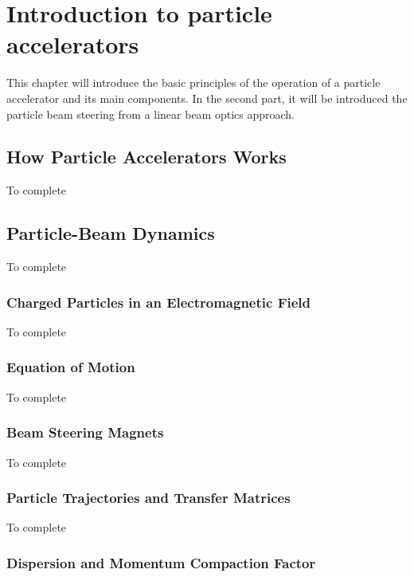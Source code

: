 \section{Introduction to particle accelerators} %

This chapter will introduce the basic principles of the operation of a particle accelerator
and its main components. In the second part, it will be introduced the particle beam steering
from a linear beam optics approach.

\subsection{How Particle Accelerators Works} %

To complete

\subsection{Particle-Beam Dynamics} %

To complete

\subsubsection{Charged Particles in an Electromagnetic Field} %

To complete

\subsubsection{Equation of Motion} %

To complete


\subsubsection{Beam Steering Magnets} %

To complete

\subsubsection{Particle Trajectories and Transfer Matrices} %

To complete


\subsubsection{Dispersion and Momentum Compaction Factor} %

